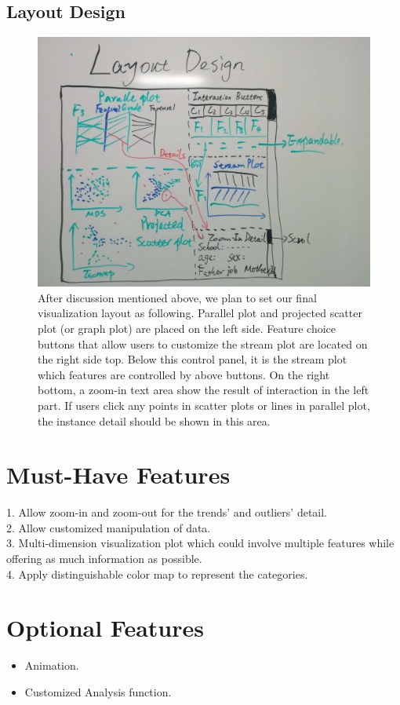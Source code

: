 \documentclass{article}
\begin{document}
\subsection{Layout Design}
\begin{figure}[H]
\centering
\includegraphics[scale=0.35]{layout_design.jpg}
\caption{After discussion mentioned above, we plan to set our final visualization layout as following.  Parallel plot and projected scatter plot (or graph plot) are placed on the left side. Feature choice buttons that allow users to customize the stream plot are located on the right side top. Below this control panel, it is the stream plot which features are controlled by above buttons. On the right bottom, a zoom-in text area show the result  of interaction in the left part. If users click any points in scatter plots or lines in parallel plot, the instance detail should be shown in this area.}
\end{figure}
\section{Must-Have Features}
1. Allow zoom-in and zoom-out for the trends' and outliers' detail. \\
2. Allow customized manipulation of data. \\ 
3. Multi-dimension visualization plot which could involve multiple features while offering as much information as possible. \\
4. Apply distinguishable color map to represent the categories. \\
\section{Optional Features}
\begin{itemize}
\item Animation.
\item Customized Analysis function.
\end{itemize}
\end{document}
